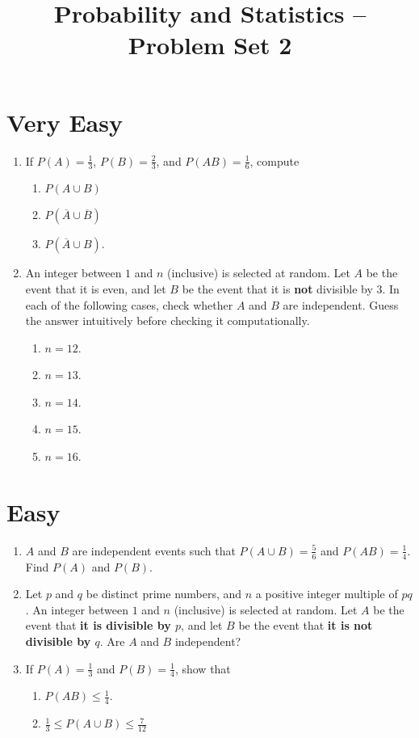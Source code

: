 \documentclass[svgnames]{amsart}
\title[]{Probability and Statistics -- Problem Set 2}
\begin{document}
\maketitle


\section{Very Easy}
\begin{enumerate}[leftmargin=*]
\item If $P(A) = \frac 1 3$, $P(B) = \frac 2 3$, and $P(AB) = \frac 1 6$, compute
\begin{enumerate}
	\item $P(A \cup B)$
	\item $P(\overline A \cup \overline B)$
	\item $P(\overline A \cup B)$.
\end{enumerate}

\item An integer between $1$ and $n$ (inclusive) is selected at random. Let $A$ be the event that it is even, and let $B$ be the event that it is \textbf{not} divisible by $3$. In each of the following cases, check whether $A$ and $B$ are independent. Guess the answer intuitively before checking it computationally.
\begin{enumerate}
	\item $n = 12$.
	\item $n = 13$.
	\item $n = 14$.
	\item $n = 15$.
	\item $n = 16$.
\end{enumerate}
\end{enumerate} %

\section{Easy}
\begin{enumerate}[leftmargin=*]
\item $A$ and $B$ are independent events such that $P(A \cup B) = \frac 5 6$ and $P(AB) = \frac 1 4$. Find $P(A)$ and $P(B)$.

\item Let $p$ and $q$ be distinct prime numbers, and $n$ a positive integer multiple of $pq$. An integer between $1$ and $n$ (inclusive) is selected at random. Let $A$ be the event that \textbf{it is divisible by $p$}, and let $B$ be the event that \textbf{it is not divisible by $q$}. Are $A$ and $B$ independent?

\item If $P(A) = \frac 1 3$ and $P(B) = \frac 1 4$, show that
\begin{enumerate}
	\item $P(AB) \le \frac 1 4$.
	\item $\frac 1 3 \le P(A \cup B) \le \frac 7 {12}$
\end{enumerate}
\end{enumerate} %
\end{document}
